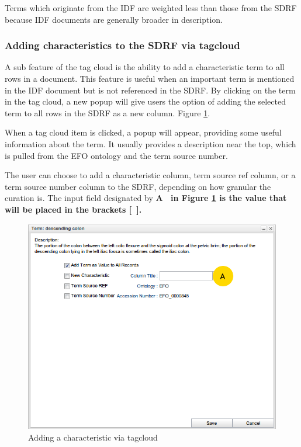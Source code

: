 \documentclass[a4paper]{article}
\begin{document}
Terms which originate from the IDF are weighted less than those from the SDRF because IDF documents are generally broader in description.

\subsubsection{Adding characteristics to the SDRF via tagcloud}
A sub feature of the tag cloud is the ability to add a characteristic term to all rows in a document. This feature is useful when an important term is mentioned in the IDF document but is not referenced in the SDRF. By clicking on the term in the tag cloud, a new popup will give users the option of adding the selected term to all rows in the SDRF as a new column. Figure \ref{tagcloudsubfeature}.

When a tag cloud item is clicked, a popup will appear, providing some useful information about the term. It usually provides a description near the top, which is pulled from the EFO ontology and the term source number.

The user can choose to add a characteristic column, term source ref column, or a term source number column to the SDRF, depending on how granular the curation is. The input field designated by \bf{A}\rm~ in Figure \ref{tagcloudsubfeature} is the value that will be placed in the brackets [~].


\begin{figure}[h]
\caption{Adding a characteristic via tagcloud}
\centering
\label{tagcloudsubfeature}
\includegraphics[width=12cm]{images/tagcloud_subfeature}
\end{figure}
\end{document}

